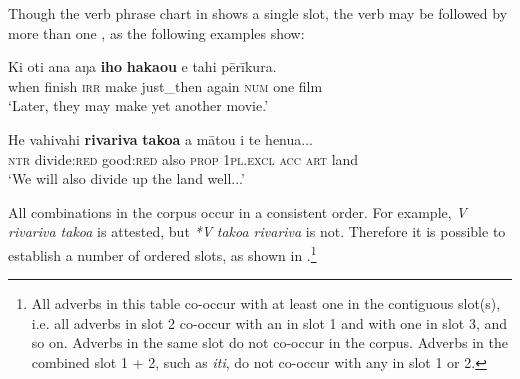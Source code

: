 Though the verb phrase chart in  shows a single  slot, the verb may be followed by more than one , as the following examples show:

\ea\label{ex:4.125}
\gll Ki oti ana aŋa \textbf{iho} \textbf{haka{\ꞌ}ou} e tahi pērīkura.\\
when finish \textsc{irr} make just\_then again \textsc{num} one film\\

\glt 
‘Later, they may make yet another movie.’ \textstyleExampleref{[R647.253]} 
\z

\ea\label{ex:4.126}
\gll He vahivahi \textbf{rivariva} \textbf{tako{\ꞌ}a} a mātou i te henua...\\
\textsc{ntr} divide:\textsc{red} good:\textsc{red} also \textsc{prop} \textsc{1pl.excl} \textsc{acc} \textsc{art} land\\

\glt
‘We will also divide up the land well...’ \textstyleExampleref{[R648.224]} 
\z

All  combinations in the corpus occur in a consistent order. For example, \textit{V rivariva tako{\ꞌ}a} is attested, but \textit{*V} \textit{tako{\ꞌ}a rivariva} is not. Therefore it is possible to establish a number of ordered  slots, as shown in .\footnote{\label{fn:191}All adverbs in this table co-occur with at least one  in the contiguous slot(s), i.e. all adverbs in slot 2 co-occur with an  in slot 1 and with one in slot 3, and so on. Adverbs in the same slot do not co-occur in the corpus. Adverbs in the combined slot 1 + 2, such as \textit{{\ꞌ}iti}, do not co-occur with any  in slot 1 or 2.} 

